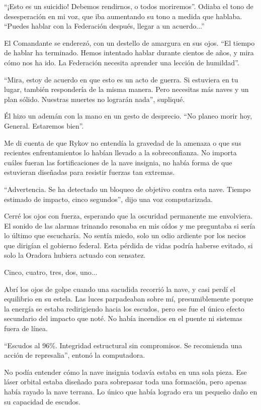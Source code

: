 \documentclass[spanish,12pt,a4paper,oneside,titlepage]{book}
\begin{document}
    ``¡Esto es un suicidio! Debemos rendirnos, o todos moriremos''. Odiaba el tono de desesperación en mi voz, que iba aumentando su tono a medida que hablaba. ``Puedes hablar con la Federación después, llegar a un acuerdo...''

    El Comandante se enderezó, con un destello de amargura en sus ojos. ``El tiempo de hablar ha terminado. Hemos intentado hablar durante cientos de años, y mira cómo nos ha ido. La Federación necesita aprender una lección de humildad''.

    ``Mira, estoy de acuerdo en que esto es un acto de guerra. Si estuviera en tu lugar, también respondería de la misma manera. Pero necesitas más naves y un plan sólido. Nuestras muertes no lograrán nada'', supliqué.

    Él hizo un ademán con la mano en un gesto de desprecio. ``No planeo morir hoy, General. Estaremos bien''.

    Me di cuenta de que Rykov no entendía la gravedad de la amenaza o que sus recientes enfrentamientos lo habían llevado a la sobreconfianza. No importa cuáles fueran las fortificaciones de la nave insignia, no había forma de que estuvieran diseñadas para resistir fuerzas tan extremas.

    ``Advertencia. Se ha detectado un bloqueo de objetivo contra esta nave. Tiempo estimado de impacto, cinco segundos'', dijo una voz computarizada.

    Cerré los ojos con fuerza, esperando que la oscuridad permanente me envolviera. El sonido de las alarmas trinando resonaba en mis oídos y me preguntaba si sería lo último que escucharía. No sentía miedo, solo un odio ardiente por los necios que dirigían el gobierno federal. Esta pérdida de vidas podría haberse evitado, si solo la Oradora hubiera actuado con sensatez.

    Cinco, cuatro, tres, dos, uno...

    Abrí los ojos de golpe cuando una sacudida recorrió la nave, y casi perdí el equilibrio en su estela. Las luces parpadeaban sobre mí, presumiblemente porque la energía se estaba redirigiendo hacia los escudos, pero ese fue el único efecto secundario del impacto que noté. No había incendios en el puente ni sistemas fuera de línea.

    ``Escudos al 96\%. Integridad estructural sin compromisos. Se recomienda una acción de represalia'', entonó la computadora.

    No podía entender cómo la nave insignia todavía estaba en una sola pieza. Ese láser orbital estaba diseñado para sobrepasar toda una formación, pero apenas había rayado la nave terrana. Lo único que había logrado era un pequeño daño en su capacidad de escudos.
\end{document}
